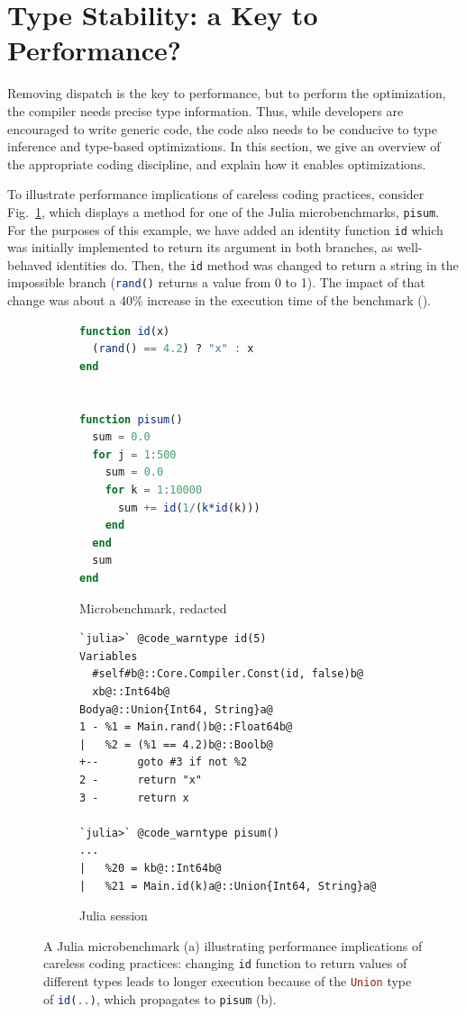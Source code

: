 \documentclass[oneside,openright,titlepage,numbers=noenddot,%
headinclude,footinclude,cleardoublepage=empty,abstract=on,
BCOR=5mm,paper=a4,fontsize=11pt,
dvipsnames
]{scrreprt}
\renewcommand{\c}[1]{\lstinline[language=Julia]!#1!\xspace}
\begin{document}
\section{Type Stability: a Key to Performance?}\label{sec:stability}

Removing dispatch is the key to performance, but to perform the optimization,
the compiler needs precise type information. Thus, while developers
are encouraged to write generic code, the code also needs to be conducive
to type inference and type-based optimizations. In this section,
we give an overview of the appropriate coding discipline, and explain
how it enables optimizations.

To illustrate performance implications of careless
coding practices, consider Fig.~\ref{ide}, which displays a method for one of
the Julia microbenchmarks, \c{pisum}. For the purposes of this example, we
have added an identity function \c{id} which was initially implemented to
return its argument in both branches, as well-behaved identities do.
Then, the \c{id} method was changed to return a string in the impossible
branch (\c{rand()} returns a value from 0 to 1). The impact of that change
was about a 40\% increase in the execution time of the benchmark (\juliaversion).


\begin{figure}[h!]
\centering
\begin{subfigure}[b]{0.49\textwidth}
\centering
\begin{lstlisting}[language=julia,style=jterm]
function id(x)
  (rand() == 4.2) ? "x" : x
end


function pisum()
  sum = 0.0
  for j = 1:500
    sum = 0.0
    for k = 1:10000
      sum += id(1/(k*id(k)))
    end
  end
  sum
end
\end{lstlisting}
\caption{Microbenchmark, redacted}
\end{subfigure}
%
\begin{subfigure}[b]{0.48\textwidth}
\begin{lstlisting}[style=jterm]
`julia>` @code_warntype id(5)
Variables
  #self#b@::Core.Compiler.Const(id, false)b@
  xb@::Int64b@
Bodya@::Union{Int64, String}a@
1 - %1 = Main.rand()b@::Float64b@
|   %2 = (%1 == 4.2)b@::Boolb@
+--      goto #3 if not %2
2 -      return "x"
3 -      return x

`julia>` @code_warntype pisum()
...
|   %20 = kb@::Int64b@
|   %21 = Main.id(k)a@::Union{Int64, String}a@
\end{lstlisting}
\caption{Julia session}
%
\end{subfigure}
\caption{A Julia microbenchmark (a) illustrating performance implications
  of careless coding practices: changing \c{id} function to return
  values of different types leads to longer execution
  because of the \c{Union} type of \c{id(..)}, which propagates to \c{pisum} (b).}%
\label{ide}
\end{figure}
\end{document}
